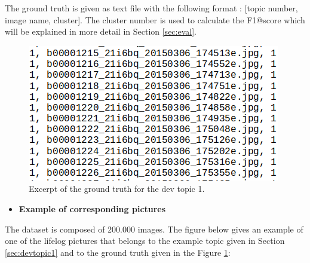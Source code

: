     The ground truth is given as text file with the following format : [topic number, image name, cluster].
    The cluster number is used to calculate the F1@score which will be explained in more detail in Section \ref{sec:eval}.


    \begin{figure}[htb]
        
        \centering
        \captionsetup{justification=centering}
        \includegraphics[scale = 0.55]{Sections/5ImageClef/images/gt_t1.png}
        \caption{Excerpt of the ground truth for the dev topic 1.}  
        \label{fig:gt}
    \end{figure}

    \begin{itemize}
        \item    \textbf{Example of corresponding pictures}
    \end{itemize}
 

    The dataset is composed of 200.000 images. The figure below gives an example of one of the lifelog pictures that belongs to the example topic given in Section \ref{sec:devtopic1} and to the ground truth given in the Figure \ref{fig:gt}:


